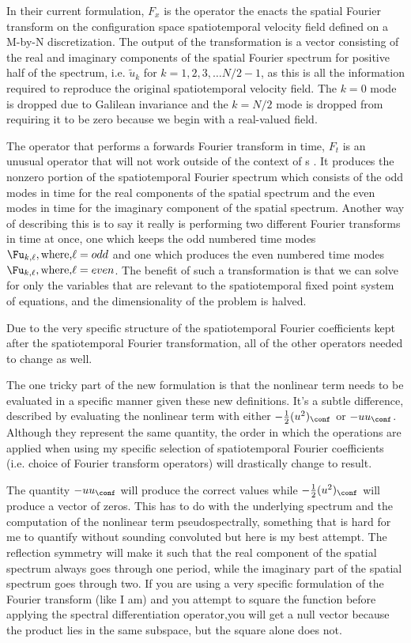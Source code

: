 \begin{description}
{In their current formulation, $F_x$ is the operator the enacts the spatial Fourier transform on the
configuration space spatiotemporal velocity field defined on a M-by-N discretization. The output
of the transformation is a vector consisting of the real and imaginary components of the spatial
Fourier spectrum for positive half of the spectrum, i.e. $\tilde{u}_k$ for $k = 1,2,3, \ldots N/2-1$,
as this is all the information required to reproduce the original spatiotemporal velocity field. The
$k=0$ mode is dropped due to Galilean invariance and the $k = N/2$ mode is dropped from requiring it
to be zero because we begin with a real-valued field.

The operator that performs a forwards Fourier transform in time, $F_t$ is an unusual operator that
will not work outside of the context of {\ppo}s . It produces the nonzero portion of the spatiotemporal
Fourier spectrum which consists of the odd modes in time for the real components of the spatial spectrum
and the even modes in time for the imaginary component of the spatial spectrum. Another way of describing
this is to say it really is performing two different Fourier transforms in time at once, one which keeps the odd
numbered time modes $\Fu_{k,\ell}, \mbox{where,} \ell = odd$ and one which produces the even numbered time
modes $\Fu_{k,\ell}, \mbox{where,} \ell = even$. The benefit of such a transformation is that we can solve
for only the variables that are relevant to the spatiotemporal fixed point system of equations, and the
dimensionality of the problem is halved.

Due to the very specific structure of the spatiotemporal Fourier coefficients kept after the spatiotemporal
Fourier transformation, all of the other operators needed to change as well.

The one tricky part of the new formulation is that the nonlinear term needs to be evaluated in a specific
manner given these new definitions. It's a subtle difference, described by evaluating the nonlinear term
with either $-\frac{1}{2}(u^2)_\conf$ or $-u u_\conf$. Although they represent the same quantity, the order
in which the operations are applied when using my specific selection of spatiotemporal Fourier coefficients
(i.e. choice of Fourier transform operators) will drastically change to result.

The quantity $-u u_\conf$ will produce the correct values while $-\frac{1}{2}(u^2)_\conf$ will produce a vector
of zeros. This has to do with the underlying spectrum and the computation of the nonlinear term pseudospectrally,
something that is hard for me to quantify without sounding convoluted but here is my best attempt. The reflection
symmetry will make it such that the real component of the spatial spectrum always goes through one period, while
the imaginary part of the spatial spectrum goes through two. If you are using a very specific formulation of
the Fourier transform (like I am) and you attempt to square the function before applying the spectral differentiation
operator,you will get a null vector because the product lies in the same subspace, but the square alone does not.

}
\end{description}
